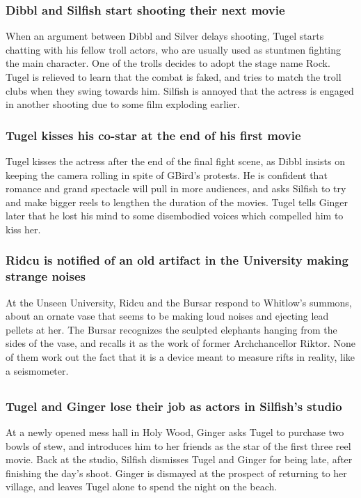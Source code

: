 \subsubsection{\Gls{Dibbl} and \Gls{Silfish} start shooting their next movie}
When an argument between \Gls{Dibbl} and \Gls{Silver} delays shooting, \Gls{Tugel} starts chatting
with his fellow troll actors, who are usually used as stuntmen fighting the main character. One
of the trolls decides to adopt the stage name \Gls{Rock}. \Gls{Tugel} is relieved to learn that
the combat is faked, and tries to match the troll clubs when they swing towards him. \Gls{Silfish}
is annoyed that the actress is engaged in another shooting due to some film exploding earlier.

\subsubsection{\Gls{Tugel} kisses his co-star at the end of his first movie}
\Gls{Tugel} kisses the actress after the end of the final fight scene, as \Gls{Dibbl} insists on
keeping the camera rolling in spite of \Gls{GBird}'s protests. He is confident that romance and
grand spectacle will pull in more audiences, and asks \Gls{Silfish} to try and make bigger reels
to lengthen the duration of the movies. \Gls{Tugel} tells \Gls{Ginger} later that he lost his mind
to some disembodied voices which compelled him to kiss her.

\subsubsection{\Gls{Ridcu} is notified of an old artifact in the University making strange noises}
At the Unseen University, \Gls{Ridcu} and the \Gls{Bursar} respond to \Gls{Whitlow}'s summons,
about an ornate vase that seems to be making loud noises and ejecting lead pellets at her. The
\Gls{Bursar} recognizes the sculpted elephants hanging from the sides of the vase, and recalls it
as the work of former Archchancellor \Gls{Riktor}. None of them work out the fact that it is a
device meant to measure rifts in reality, like a seismometer.

\subsection{}
\subsubsection{\Gls{Tugel} and \Gls{Ginger} lose their job as actors in \Gls{Silfish}'s studio}
At a newly opened mess hall in Holy Wood, \Gls{Ginger} asks \Gls{Tugel} to purchase two bowls of
stew, and introduces him to her friends as the star of the first three reel movie. Back at the
studio, \Gls{Silfish} dismisses \Gls{Tugel} and \Gls{Ginger} for being late, after finishing the
day's shoot. \Gls{Ginger} is dismayed at the prospect of returning to her village, and leaves
\Gls{Tugel} alone to spend the night on the beach.

